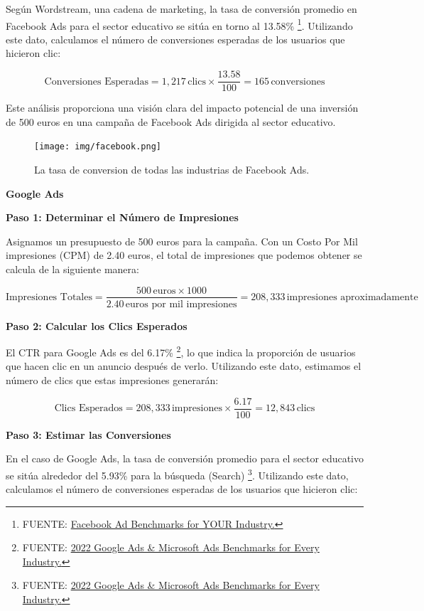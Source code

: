 \documentclass[
]{article}
\begin{document}
Según Wordstream, una cadena de marketing, la tasa de conversión
promedio en Facebook Ads para el sector educativo se sitúa en torno al
13.58\% \footnote{FUENTE:
  \href{https://www.wordstream.com/blog/ws/2017/02/28/facebook-advertising-benchmarks}{Facebook
  Ad Benchmarks for YOUR Industry.}}. Utilizando este dato, calculamos
el número de conversiones esperadas de los usuarios que hicieron clic:

\[
\text{Conversiones Esperadas} = 1,217 \, \text{clics} \times \frac{13.58}{100} = 165 \, \text{conversiones}
\]

Este análisis proporciona una visión clara del impacto potencial de una
inversión de 500 euros en una campaña de Facebook Ads dirigida al sector
educativo.

\begin{figure}
\centering
\texttt{[image: img/facebook.png]}
\caption{La tasa de conversion de todas las industrias de Facebook Ads.}
\end{figure}

\textbf{Google Ads}

\textbf{Paso 1: Determinar el Número de Impresiones}

Asignamos un presupuesto de 500 euros para la campaña. Con un Costo Por
Mil impresiones (CPM) de 2.40 euros, el total de impresiones que podemos
obtener se calcula de la siguiente manera:

\[
\text{Impresiones Totales} = \frac{500 \, \text{euros} \times 1000}{2.40 \, \text{euros por mil impresiones}} = 208,333 \, \text{impresiones aproximadamente}
\]

\textbf{Paso 2: Calcular los Clics Esperados}

El CTR para Google Ads es del 6.17\% \footnote{FUENTE:
  \href{https://www.wordstream.com/blog/ws/2022/05/18/search-advertising-benchmarks}{2022
  Google Ads \& Microsoft Ads Benchmarks for Every Industry.}}, lo que
indica la proporción de usuarios que hacen clic en un anuncio después de
verlo. Utilizando este dato, estimamos el número de clics que estas
impresiones generarán:

\[
\text{Clics Esperados} = 208,333 \, \text{impresiones} \times \frac{6.17}{100} = 12,843 \, \text{clics}
\]

\textbf{Paso 3: Estimar las Conversiones}

En el caso de Google Ads, la tasa de conversión promedio para el sector
educativo se sitúa alrededor del 5.93\% para la búsqueda (Search)
\footnote{FUENTE:
  \href{https://www.wordstream.com/blog/ws/2022/05/18/search-advertising-benchmarks}{2022
  Google Ads \& Microsoft Ads Benchmarks for Every Industry.}}.
Utilizando este dato, calculamos el número de conversiones esperadas de
los usuarios que hicieron clic:
\end{document}
